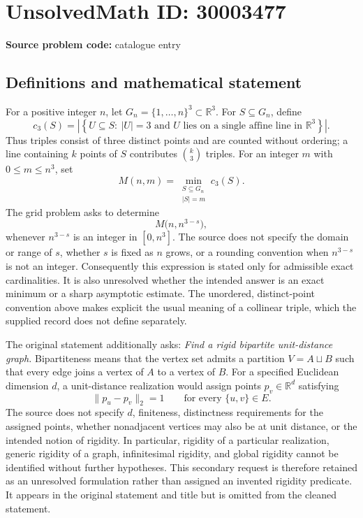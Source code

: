 \documentclass[11pt]{article}
\newcommand{\R}{\mathbb{R}}
\begin{document}
\section*{UnsolvedMath ID: 30003477}
\textbf{Source problem code:} catalogue entry
\subsection{Definitions and mathematical statement}
For a positive integer \(n\), let \(G_n=\{1,\ldots,n\}^3\subset\R^3\). For \(S\subseteq G_n\), define
\[
 c_3(S)=\left|\left\{U\subseteq S:\ |U|=3\text{ and }U\text{ lies on a single affine line in }\R^3\right\}\right|.
\]
Thus triples consist of three distinct points and are counted without ordering; a line containing \(k\) points of \(S\) contributes \(\binom{k}{3}\) triples. For an integer \(m\) with \(0\le m\le n^3\), set
\[
 M(n,m)=\min_{\substack{S\subseteq G_n\\|S|=m}}c_3(S).
\]
The grid problem asks to determine
\[
 M\bigl(n,n^{3-s}\bigr),
\]
whenever \(n^{3-s}\) is an integer in \([0,n^3]\). The source does not specify the domain or range of \(s\), whether \(s\) is fixed as \(n\) grows, or a rounding convention when \(n^{3-s}\) is not an integer. Consequently this expression is stated only for admissible exact cardinalities. It is also unresolved whether the intended answer is an exact minimum or a sharp asymptotic estimate. The unordered, distinct-point convention above makes explicit the usual meaning of a collinear triple, which the supplied record does not define separately.

The original statement additionally asks: \emph{Find a rigid bipartite unit-distance graph.} Bipartiteness means that the vertex set admits a partition \(V=A\sqcup B\) such that every edge joins a vertex of \(A\) to a vertex of \(B\). For a specified Euclidean dimension \(d\), a unit-distance realization would assign points \(p_v\in\R^d\) satisfying
\[
 \|p_u-p_v\|_2=1\qquad\text{for every }\{u,v\}\in E.
\]
The source does not specify \(d\), finiteness, distinctness requirements for the assigned points, whether nonadjacent vertices may also be at unit distance, or the intended notion of rigidity. In particular, rigidity of a particular realization, generic rigidity of a graph, infinitesimal rigidity, and global rigidity cannot be identified without further hypotheses. This secondary request is therefore retained as an unresolved formulation rather than assigned an invented rigidity predicate. It appears in the original statement and title but is omitted from the cleaned statement.
\end{document}
